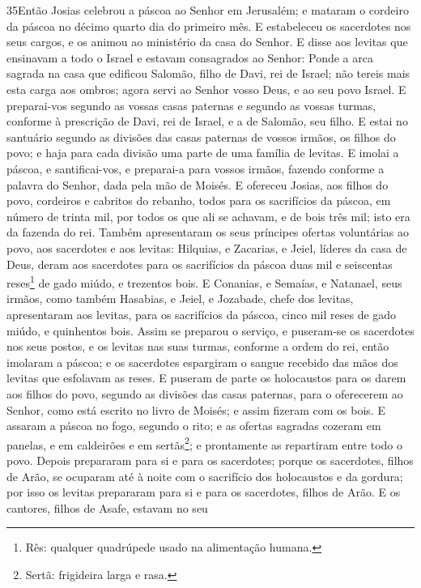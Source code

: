 \lettrine{35} Então Josias celebrou a páscoa ao Senhor em
Jerusalém; e mataram o cordeiro da páscoa no décimo quarto dia do
primeiro mês. E estabeleceu os sacerdotes nos seus cargos, e os
animou ao ministério da casa do Senhor. E disse aos levitas que
ensinavam a todo o Israel e estavam consagrados ao Senhor: Ponde a
arca sagrada na casa que edificou Salomão, filho de Davi, rei de
Israel; não tereis mais esta carga aos ombros; agora servi ao Senhor
vosso Deus, e ao seu povo Israel. E preparai-vos segundo as
vossas casas paternas e segundo as vossas turmas, conforme à
prescrição de Davi, rei de Israel, e a de Salomão, seu filho.
 E estai no santuário segundo as divisões das casas paternas de
vossos irmãos, os filhos do povo; e haja para cada divisão uma parte
de uma família de levitas. E imolai a páscoa, e santificai-vos,
e preparai-a para vossos irmãos, fazendo conforme a palavra do
Senhor, dada pela mão de Moisés. E ofereceu Josias, aos filhos
do povo, cordeiros e cabritos do rebanho, todos para os sacrifícios
da páscoa, em número de trinta mil, por todos os que ali se achavam,
e de bois três mil; isto era da fazenda do rei. Também
apresentaram os seus príncipes ofertas voluntárias ao povo, aos
sacerdotes e aos levitas: Hilquias, e Zacarias, e Jeiel, líderes da
casa de Deus, deram aos sacerdotes para os sacrifícios da páscoa
duas mil e seiscentas reses\footnote{Rês: qualquer quadrúpede usado
na alimentação humana.} de gado miúdo, e trezentos bois. E
Conanias, e Semaías, e Natanael, seus irmãos, como também Hasabias,
e Jeiel, e Jozabade, chefe dos levitas, apresentaram aos levitas,
para os sacrifícios da páscoa, cinco mil reses de gado miúdo, e
quinhentos bois. Assim se preparou o serviço, e puseram-se os
sacerdotes nos seus postos, e os levitas nas suas turmas, conforme a
ordem do rei, então imolaram a páscoa; e os sacerdotes
espargiram o sangue recebido das mãos dos levitas que esfolavam as
reses. E puseram de parte os holocaustos para os darem aos
filhos do povo, segundo as divisões das casas paternas, para o
oferecerem ao Senhor, como está escrito no livro de Moisés; e assim
fizeram com os bois. E assaram a páscoa no fogo, segundo o
rito; e as ofertas sagradas cozeram em panelas, e em caldeirões e em
sertãs\footnote{Sertã: frigideira larga e rasa.}; e prontamente as
repartiram entre todo o povo. Depois prepararam para si e
para os sacerdotes; porque os sacerdotes, filhos de Arão, se
ocuparam até à noite com o sacrifício dos holocaustos e da gordura;
por isso os levitas prepararam para si e para os sacerdotes, filhos
de Arão. E os cantores, filhos de Asafe, estavam no seu
